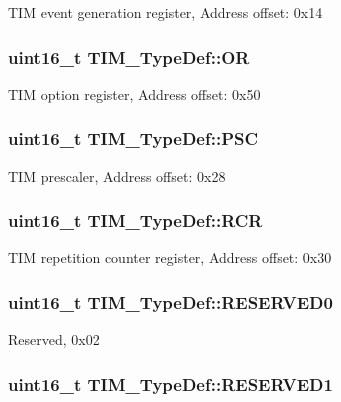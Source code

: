 T\-I\-M event generation register, Address offset\-: 0x14 \hypertarget{struct_t_i_m___type_def_a145760563b46fcdeedddf7c92ee68d61}{
\subsubsection[{O\-R}]{ uint16\-\_\-t T\-I\-M\-\_\-\-Type\-Def\-::\-O\-R}}\label{struct_t_i_m___type_def_a145760563b46fcdeedddf7c92ee68d61}
T\-I\-M option register, Address offset\-: 0x50 \hypertarget{struct_t_i_m___type_def_ad58e05db30d309608402a69d87c36505}{
\subsubsection[{P\-S\-C}]{ uint16\-\_\-t T\-I\-M\-\_\-\-Type\-Def\-::\-P\-S\-C}}\label{struct_t_i_m___type_def_ad58e05db30d309608402a69d87c36505}
T\-I\-M prescaler, Address offset\-: 0x28 \hypertarget{struct_t_i_m___type_def_aa6957ece6ee709031ab5241d6019fcce}{
\subsubsection[{R\-C\-R}]{ uint16\-\_\-t T\-I\-M\-\_\-\-Type\-Def\-::\-R\-C\-R}}\label{struct_t_i_m___type_def_aa6957ece6ee709031ab5241d6019fcce}
T\-I\-M repetition counter register, Address offset\-: 0x30 \hypertarget{struct_t_i_m___type_def_a88caad1e82960cc6df99d935ece26c1b}{
\subsubsection[{R\-E\-S\-E\-R\-V\-E\-D0}]{\setlength{\rightskip}{0pt plus 5cm}uint16\-\_\-t T\-I\-M\-\_\-\-Type\-Def\-::\-R\-E\-S\-E\-R\-V\-E\-D0}}\label{struct_t_i_m___type_def_a88caad1e82960cc6df99d935ece26c1b}
Reserved, 0x02 \hypertarget{struct_t_i_m___type_def_a59c46ac3a56c6966a7f8f379a2fd1e3e}{
\subsubsection[{R\-E\-S\-E\-R\-V\-E\-D1}]{\setlength{\rightskip}{0pt plus 5cm}uint16\-\_\-t T\-I\-M\-\_\-\-Type\-Def\-::\-R\-E\-S\-E\-R\-V\-E\-D1}}\label{struct_t_i_m___type_def_a59c46ac3a56c6966a7f8f379a2fd1e3e}

